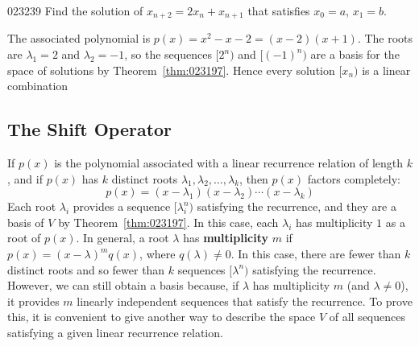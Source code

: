 \begin{example}{}{023239}
Find the solution of $x_{n+2} = 2x_{n} + x_{n+1}$ that satisfies $x_{0} = a$, $x_{1} = b$.


\begin{solution}
  The associated polynomial is $p(x) = x^{2} - x - 2 = (x - 2)(x + 1)$. The roots are $\lambda_{1} = 2$ and $\lambda_{2} = -1$, so the sequences $[2^n)$ and $[(-1)^n)$ are a basis for the space of solutions by Theorem~\ref{thm:023197}. Hence every solution $[x_{n})$ is a linear combination
\begin{equation*}
[x_n) = t_1[2^n) + t_2[(-1)^n)
\end{equation*}
This means that $x_{n} = t_{1}2^{n} + t_{2}(-1)^{n}$ holds for $n = 0, 1, 2, \dots$, so (taking $n = 0, 1$) $x_{0} = a$ and $x_{1} = b$ give
\begin{align*}
t_1 + t_2 &= a \\
2t_1 - t_2 &= b
\end{align*}
These are easily solved: $t_1 = \frac{1}{3}(a + b)$ and $t_2 = \frac{1}{3}(2a - b)$, so
\begin{equation*}
t_n = \frac{1}{3}\left[(a + b)2^n + (2a - b)(-1)^n\right]
\end{equation*}
\end{solution}
\end{example}

\subsection*{The Shift Operator}

If $p(x)$ is the polynomial associated with a linear recurrence relation of length $k$, and if $p(x)$ has $k$ distinct roots $\lambda_{1}, \lambda_{2}, \dots, \lambda_{k}$, then $p(x)$ factors completely:
\begin{equation*}
p(x) = (x - \lambda_1)(x - \lambda_2)\cdots(x - \lambda_k)
\end{equation*}
Each root $\lambda_{i}$ provides a sequence $[\lambda_{i}^{n})$ satisfying the recurrence, and they are a basis of $V$ by Theorem~\ref{thm:023197}. In this case, each $\lambda_{i}$ has multiplicity $1$ as a root of $p(x)$. In general, a root $\lambda$ has \textbf{multiplicity} $m$ if $p(x) = (x - \lambda)^{m}q(x)$, where $q(\lambda) \neq 0$. In this case, there are fewer than $k$ distinct roots and so fewer than $k$ sequences $[\lambda^{n})$ satisfying the recurrence. However, we can still obtain a basis because, if $\lambda$ has multiplicity $m$ (and $\lambda \neq 0$), it provides $m$ linearly independent sequences that satisfy the recurrence. To prove this, it is convenient to give another way to describe the space $V$ of all sequences satisfying a given linear recurrence relation.

